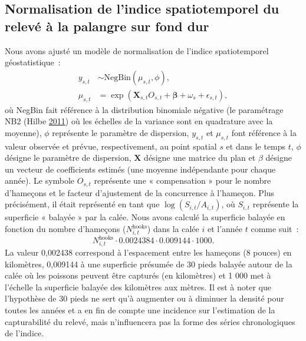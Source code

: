 \documentclass[11pt]{book}
\begin{document}
\hypertarget{sec:hbll-spatiotemporal}{%
\subsection{Normalisation de l'indice spatiotemporel du relevé à la palangre sur fond dur}\label{sec:hbll-spatiotemporal}}

Nous avons ajusté un modèle de normalisation de l'indice spatiotemporel géostatistique~:
\begin{align}
  y_{s,t} &\sim \mathrm{NegBin}\left(\mu_{s,t}, \phi \right),\\
  \mu_{s,t} &= \exp \left( \bm{X}_{s,t} O_{s,t} + \bm{\beta} + \omega_s + \epsilon_{s,t} \right),
\label{eq:hbll-model}
\end{align}
où NegBin fait référence à la distribution binomiale négative (le paramétrage NB2 (Hilbe \protect\hyperlink{ref-hilbe2011}{2011}) où les échelles de la variance sont en quadrature avec la moyenne), \(\phi\) représente le paramètre de dispersion, \(y_{s,t}\) et \(\mu_{s,t}\) font référence à la valeur observée et prévue, respectivement, au point spatial \(s\) et dans le temps \(t\), \(\phi\) désigne le paramètre de dispersion, \(\bm{X}\) désigne une matrice du plan et \(\beta\) désigne un vecteur de coefficients estimés (une moyenne indépendante pour chaque année). Le symbole \(O_{s,t}\) représente une « compensation » pour le nombre d'hameçons et le facteur d'ajustement de la concurrence à l'hameçon. Plus précisément, il était représenté en tant que \(\log \left(S_{i,t} / A_{i,t} \right)\), où \(S_{i,t}\) représente la superficie « balayée » par la calée. Nous avons calculé la superficie balayée en fonction du nombre d'hameçons (\(N^\textrm{hooks}_{i,t}\)) dans la calée \(i\) et l'année \(t\) comme suit~:
\begin{equation}
N^\textrm{hooks}_{i,t} \cdot 0.0024384 \cdot 0.009144 \cdot 1000.
\end{equation}
La valeur 0,002438 correspond à l'espacement entre les hameçons (8 pouces) en kilomètres, 0,009144 à une superficie présumée de 30 pieds balayée autour de la calée où les poissons peuvent être capturés (en kilomètres) et 1 000 met à l'échelle la superficie balayée des kilomètres aux mètres. Il est à noter que l'hypothèse de 30 pieds ne sert qu'à augmenter ou à diminuer la densité pour toutes les années et a en fin de compte une incidence sur l'estimation de la capturabilité du relevé, mais n'influencera pas la forme des séries chronologiques de l'indice.
\end{document}
